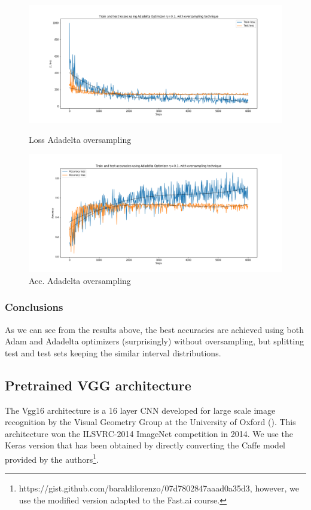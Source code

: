 \documentclass{article}
\begin{document}
\begin{figure}[ht]
  \begin{minipage}[b]{0.5\linewidth}
    \centering
    \includegraphics[width=1.1\linewidth]{loss_adadel_oversample.png} 
    \caption{Loss Adadelta oversampling} 
  \end{minipage}
  \begin{minipage}[b]{0.5\linewidth}
    \centering
    \includegraphics[width=1.1\linewidth]{acc_adadel_oversample.png} 
    \caption{Acc. Adadelta oversampling}
  \end{minipage} 
\end{figure}

\subsubsection{Conclusions}
As we can see from the results above, the best accuracies are achieved using both Adam and Adadelta optimizers (surprisingly) without oversampling, but splitting test and test sets keeping the similar interval distributions. 








\subsection{Pretrained VGG architecture}
The Vgg16 architecture is a 16 layer CNN developed for large scale image recognition by the Visual Geometry Group at the University of Oxford (\cite{SZ14}). This architecture won the ILSVRC-2014 ImageNet competition in 2014. We use the Keras version that has been obtained by directly converting the Caffe model provided by the authors\footnote{https://gist.github.com/baraldilorenzo/07d7802847aaad0a35d3, however, we use the modified version adapted to the Fast.ai course.}.
\end{document}
